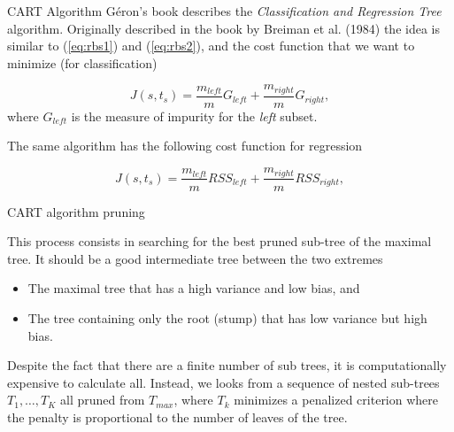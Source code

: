 \documentclass{beamer}
\begin{document}
\begin{frame}{CART Algorithm}
	G\'eron's book describes the {\it Classification and Regression Tree}  algorithm. Originally described in the book by Breiman et al. (1984) the idea is similar to (\ref{eq:rbs1}) and (\ref{eq:rbs2}), and the cost function that we want to minimize (for classification)
	
	\begin{equation}
		J(s,t_s) = \frac{m_{left}}{m} G_{left}+ \frac{m_{right}}{m} G_{right},
	\end{equation}
where $G_{left}$ is the measure of impurity for the {\it left} subset. 

The same algorithm has the following cost function for regression 

\begin{equation*}
	J(s,t_s)= \frac{m_{left}}{m} RSS_{left}+ \frac{m_{right}}{m} RSS_{right},
\end{equation*}

\end{frame}

\begin{frame}{CART algorithm pruning}

This process consists in searching for the best pruned sub-tree of the maximal tree.  It should be a good intermediate tree between the two extremes

\begin{itemize}
	\item The maximal tree that has a high variance and low bias, and
	\item The tree containing only the root (stump) that has low variance but high bias.
\end{itemize}

Despite the fact that there are a finite number of sub trees, it is computationally expensive to calculate all. Instead, we looks from a sequence of nested sub-trees $T_1,\ldots, T_K$ all pruned from $T_{max}$, where $T_k$ minimizes a penalized criterion where the penalty is proportional to the number of leaves of the tree. 

\end{frame} 
\end{document}
